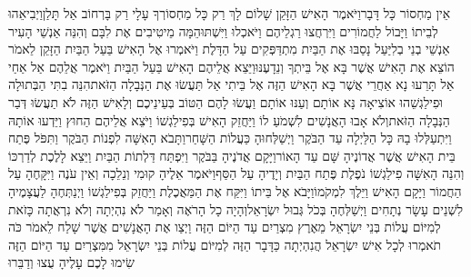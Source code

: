 \documentclass[../main/main.tex]{subfiles}
\begin{document}
\begin{multicols*}{\ncols}
אֵין מַחְסוֹר כָּל דָּבָר\PreVerseSpace{}וַיֹּאמֶר הָאִישׁ הַזָּקֵן שָׁלוֹם לָךְ רַק כָּל מַחְסוֹרְךָ עָלָי רַק בָּרְחוֹב אַל תָּלַן\PreVerseSpace{}וַיְבִיאֵהוּ לְבֵיתוֹ וַיָּבוֹל לַחֲמוֹרִים וַיִּרְחֲצוּ רַגְלֵיהֶם וַיֹּאכְלוּ וַיִּשְׁתּוּ\PreVerseSpace{}הֵמָּה מֵיטִיבִים אֶת לִבָּם וְהִנֵּה אַנְשֵׁי הָעִיר אַנְשֵׁי בְנֵי בְלִיַּעַל נָסַבּוּ אֶת הַבַּיִת מִתְדַּפְּקִים עַל הַדָּלֶת וַיֹּאמְרוּ אֶל הָאִישׁ בַּעַל הַבַּיִת הַזָּקֵן לֵאמֹר הוֹצֵא אֶת הָאִישׁ אֲשֶׁר בָּא אֶל בֵּיתְךָ וְנֵדָעֶנּוּ\PreVerseSpace{}וַיֵּצֵא אֲלֵיהֶם הָאִישׁ בַּעַל הַבַּיִת וַיֹּאמֶר אֲלֵהֶם אַל אַחַי אַל תָּרֵעוּ נָא אַחֲרֵי אֲשֶׁר בָּא הָאִישׁ הַזֶּה אֶל בֵּיתִי אַל תַּעֲשׂוּ אֶת הַנְּבָלָה הַזֹּאת\PreVerseSpace{}הִנֵּה בִתִּי הַבְּתוּלָה וּפִילַגְשֵׁהוּ אוֹצִיאָה נָּא אוֹתָם וְעַנּוּ אוֹתָם וַעֲשׂוּ לָהֶם הַטּוֹב בְּעֵינֵיכֶם וְלָאִישׁ הַזֶּה לֹא תַעֲשׂוּ דְּבַר הַנְּבָלָה הַזֹּאת\PreVerseSpace{}וְלֹא אָבוּ הָאֲנָשִׁים לִשְׁמֹעַ לוֹ וַיַּחֲזֵק הָאִישׁ בְּפִילַגְשׁוֹ וַיֹּצֵא אֲלֵיהֶם הַחוּץ וַיֵּדְעוּ אוֹתָהּ וַיִּתְעַלְּלוּ בָהּ כָּל הַלַּיְלָה עַד הַבֹּקֶר וַיְשַׁלְּחוּהָ כַּעֲלוֹת\SubEnd{} הַשָּׁחַר\PreVerseSpace{}וַתָּבֹא הָאִשָּׁה לִפְנוֹת הַבֹּקֶר וַתִּפֹּל פֶּתַח בֵּית הָאִישׁ אֲשֶׁר אֲדוֹנֶיהָ שָּׁם עַד הָאוֹר\PreVerseSpace{}וַיָּקָם אֲדֹנֶיהָ בַּבֹּקֶר וַיִּפְתַּח דַּלְתוֹת הַבַּיִת וַיֵּצֵא לָלֶכֶת לְדַרְכּוֹ וְהִנֵּה הָאִשָּׁה פִילַגְשׁוֹ נֹפֶלֶת פֶּתַח הַבַּיִת וְיָדֶיהָ עַל הַסַּף\PreVerseSpace{}וַיֹּאמֶר אֵלֶיהָ קוּמִי וְנֵלֵכָה וְאֵין עֹנֶה וַיִּקָּחֶהָ עַל הַחֲמוֹר וַיָּקָם הָאִישׁ וַיֵּלֶךְ לִמְקֹמוֹ\PreVerseSpace{}וַיָּבֹא אֶל בֵּיתוֹ וַיִּקַּח אֶת הַמַּאֲכֶלֶת וַיַּחֲזֵק בְּפִילַגְשׁוֹ וַיְנַתְּחֶהָ לַעֲצָמֶיהָ לִשְׁנֵים עָשָׂר נְתָחִים וַיְשַׁלְּחֶהָ בְּכֹל גְּבוּל יִשְׂרָאֵל\PreVerseSpace{}וְהָיָה כָל הָרֹאֶה וְאָמַר לֹא נִהְיְתָה וְלֹא נִרְאֲתָה כָּזֹאת לְמִיּוֹם עֲלוֹת בְּנֵי יִשְׂרָאֵל מֵאֶרֶץ מִצְרַיִם עַד הַיּוֹם הַזֶּה וַיְצַו אֶת הָאֲנָשִׁים אֲשֶׁר שָׁלַח לֵאמֹר כֹּה תֹאמְרוּ לְכָל אִישׁ יִשְׂרָאֵל הֲנִהְיְתָה כַּדָּבָר הַזֶּה לְמִיּוֹם עֲלוֹת בְּנֵי יִשְׂרָאֵל מִמִּצְרַיִם עַד הַיּוֹם הַזֶּה\OmitEnd{} שִׂימוּ לָכֶם עָלֶיהָ עֻצוּ וְדַבֵּרוּ\OpenSection{}\par

\end{multicols*}
\end{document}
